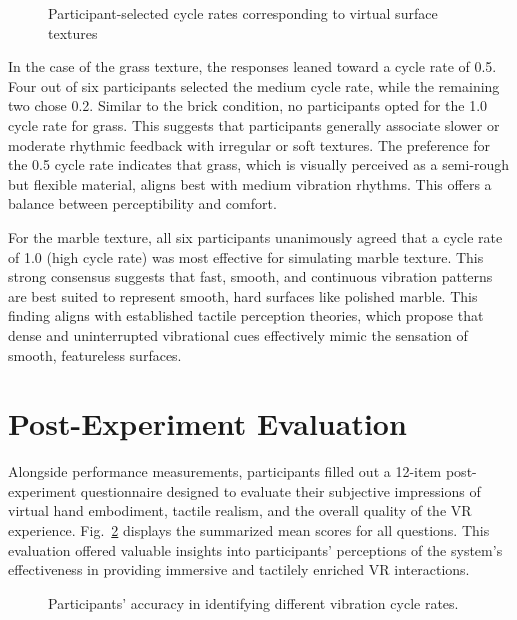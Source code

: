 \begin{figure}[H]\centering
	
	\caption{Participant-selected cycle rates corresponding to virtual surface textures}\label{fig:ex2_results}
\end{figure}

In the case of the grass texture, the responses leaned toward a cycle rate of 0.5. Four out of six participants selected the medium cycle rate, while the remaining two chose 0.2. Similar to the brick condition, no participants opted for the 1.0 cycle rate for grass. This suggests that participants generally associate slower or moderate rhythmic feedback with irregular or soft textures. The preference for the 0.5 cycle rate indicates that grass, which is visually perceived as a semi-rough but flexible material, aligns best with medium vibration rhythms. This offers a balance between perceptibility and comfort.

For the marble texture, all six participants unanimously agreed that a cycle rate of 1.0 (high cycle rate) was most effective for simulating marble texture. This strong consensus suggests that fast, smooth, and continuous vibration patterns are best suited to represent smooth, hard surfaces like polished marble. This finding aligns with established tactile perception theories, which propose that dense and uninterrupted vibrational cues effectively mimic the sensation of smooth, featureless surfaces.


\section{Post-Experiment Evaluation}
Alongside performance measurements, participants filled out a 12-item post-experiment questionnaire designed to evaluate their subjective impressions of virtual hand embodiment, tactile realism, and the overall quality of the VR experience. Fig.~\ref{fig:questionnaire_results} displays the summarized mean scores for all questions. This evaluation offered valuable insights into participants' perceptions of the system's effectiveness in providing immersive and tactilely enriched VR interactions.

\begin{figure}[H]\centering
	
	\caption{Participants' accuracy in identifying different vibration cycle rates.}\label{fig:questionnaire_results}
\end{figure}

